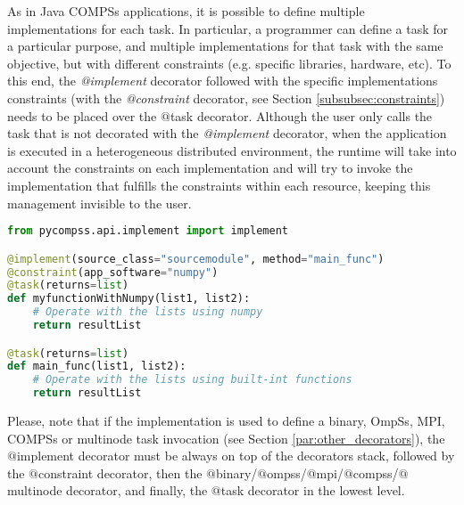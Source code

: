 As in Java COMPSs applications, it is possible to define multiple implementations for each task.
In particular, a programmer can define a task for a particular purpose, and multiple implementations for that task
with the same objective, but with different constraints (e.g. specific libraries, hardware, etc). 
To this end, the {\it @implement} decorator followed with the specific implementations constraints (with the 
{\it @constraint} decorator, see Section \ref{subsubsec:constraints}) needs to be placed over the $@$task decorator.
Although the user only calls the task that is not decorated with the {\it @implement} decorator, when the application 
is executed in a heterogeneous distributed environment, the runtime will take into account the constraints on each 
implementation  and will try to invoke the implementation that fulfills the constraints within each resource, 
keeping this management invisible to the user.


\begin{lstlisting}[language=python]
from pycompss.api.implement import implement

@implement(source_class="sourcemodule", method="main_func")
@constraint(app_software="numpy")
@task(returns=list)
def myfunctionWithNumpy(list1, list2):
    # Operate with the lists using numpy
    return resultList

@task(returns=list)
def main_func(list1, list2):
    # Operate with the lists using built-int functions
    return resultList
\end{lstlisting}

Please, note that if the implementation is used to define a binary, OmpSs, MPI, COMPSs or multinode task invocation
(see Section \ref{par:other_decorators}), the $@$implement decorator must be always on top of the decorators stack,
followed by the $@$constraint decorator, then the $@$binary/$@$ompss/$@$mpi/$@$compss/$@$multinode decorator, and finally, 
the $@$task decorator in the lowest level.

